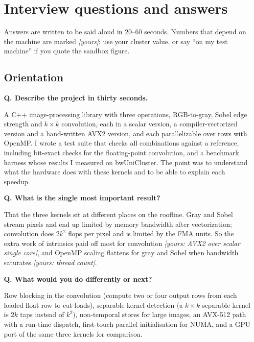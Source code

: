 \chapter{Interview questions and answers}\label{ch:qa}

\newcommand{\qa}[2]{\par\medskip\noindent\textbf{Q. #1}\par\noindent #2\par}

Answers are written to be said aloud in 20--60 seconds. Numbers that depend on the machine are marked \emph{[yours]}: use your cluster value, or say ``on my test machine'' if you quote the sandbox figure.

\section{Orientation}

\qa{Describe the project in thirty seconds.}{A C++ image-processing library with three operations, RGB-to-gray, Sobel edge strength and $k\times k$ convolution, each in a scalar version, a compiler-vectorized version and a hand-written AVX2 version, and each parallelizable over rows with OpenMP. I wrote a test suite that checks all combinations against a reference, including bit-exact checks for the floating-point convolution, and a benchmark harness whose results I measured on bwUniCluster. The point was to understand what the hardware does with these kernels and to be able to explain each speedup.}

\qa{What is the single most important result?}{That the three kernels sit at different places on the roofline. Gray and Sobel stream pixels and end up limited by memory bandwidth after vectorization; convolution does $2k^2$ flops per pixel and is limited by the FMA units. So the extra work of intrinsics paid off most for convolution \emph{[yours: AVX2 over scalar single core]}, and OpenMP scaling flattens for gray and Sobel when bandwidth saturates \emph{[yours: thread count]}.}

\qa{What would you do differently or next?}{Row blocking in the convolution (compute two or four output rows from each loaded float row to cut loads), separable-kernel detection (a $k\times k$ separable kernel is $2k$ taps instead of $k^2$), non-temporal stores for large images, an AVX-512 path with a run-time dispatch, first-touch parallel initialisation for NUMA, and a GPU port of the same three kernels for comparison.}

